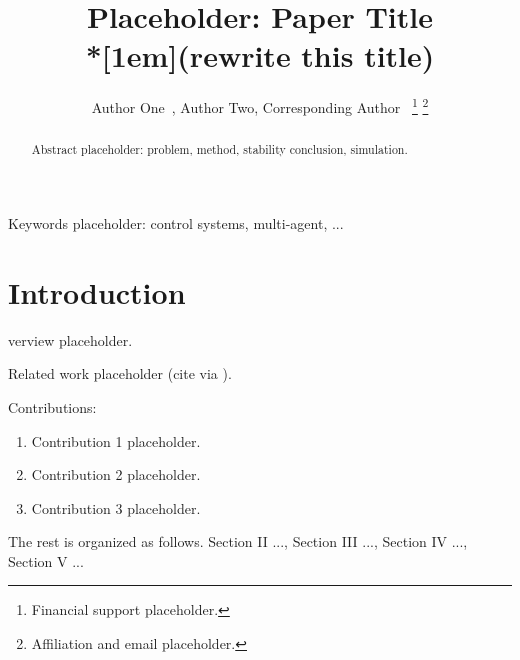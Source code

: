 \documentclass[lettersize,journal]{IEEEtran}
\begin{document}
\title{Placeholder: Paper Title\\*[1em]{\LARGE (rewrite this title)}}

\author{Author One~, Author Two,
  Corresponding Author~
\thanks{Financial support placeholder.}%
\thanks{Affiliation and email placeholder.}%
}

\maketitle

\begin{abstract}
Abstract placeholder: problem, method, stability conclusion, simulation.
\end{abstract}

\begin{IEEEkeywords}
Keywords placeholder: control systems, multi-agent, ...
\end{IEEEkeywords}

\section{Introduction}
verview placeholder.

Related work placeholder (cite via \cite{}).

Contributions:
\begin{enumerate}
\item Contribution 1 placeholder.
\item Contribution 2 placeholder.
\item Contribution 3 placeholder.
\end{enumerate}

The rest is organized as follows. Section II ..., Section III ..., Section IV ..., Section V ...

\end{document}

